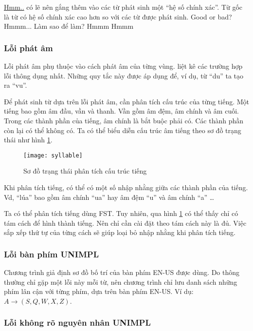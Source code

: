 \documentclass[a4paper,oneside]{book} %
\newcommand{\note}[1]{\underline{#1}}
\begin{document}
\note{Hmm..} có lẽ nên gắng thêm vào các từ phát sinh một ``hệ số chính
xác''. Từ gốc là từ có hệ số chính xác cao hơn so với các từ được phát
sinh. Good or bad? Hmmm... Làm sao để làm? Hmmm Hmmm

\subsubsection{Lỗi phát âm}

Lỗi phát âm phụ thuộc vào cách phát âm của từng
vùng. \cite{LoiChinhTa} liệt kê các trường hợp   lỗi thông dụng
nhất. Những quy tắc này được áp dụng để, ví dụ, từ   ``du'' ta tạo ra
``vu''. 

Để phát sinh từ dựa trên lỗi phát âm, cần phân tích cấu trúc của từng
tiếng. Một tiếng bao gồm âm đầu, vần và thanh. Vần gồm âm đệm, âm
chính và âm cuối. Trong các thành phần của tiếng, âm chính là bắt buộc
phải có. Các thành phần còn lại có thể không có. Ta có thể biểu diễn
cấu trúc âm tiếng theo sơ đồ trạng thái như hình \ref{fig:syllable}.

\begin{figure}[htbp]
  \centering
  \texttt{[image: syllable]}
  \caption{Sơ đồ trạng thái phân tích cấu trúc tiếng}
  \label{fig:syllable}
\end{figure}

Khi phân tích tiếng, có thể có một số nhập nhằng giữa các thành phần
của tiếng. Vd, ``lúa'' bao gồm âm chính ``ua'' hay âm đệm ``u'' và âm
chính ``a'' \ldots

Ta có thể phân tích tiếng dùng FST. Tuy nhiên, qua hình
\ref{fig:syllable} có thể thấy chỉ có tám cách để hình thành
tiếng. Nên chỉ cần cài đặt theo tám cách này là đủ. Việc sắp xếp thứ
tự của từng cách sẽ giúp loại bỏ nhập nhằng khi phân tích tiếng.

\subsubsection{Lỗi bàn phím UNIMPL}

Chương trình giả định sơ đồ bố trí của bàn phím EN-US được dùng. Do
thông thường chỉ gặp một lỗi này mỗi từ, nên chương trình chỉ lưu danh
sách những phím lân cận với từng phím, dựa trên bàn phím EN-US. Ví dụ:
$A \rightarrow (S,Q,W,X,Z)$. 

\subsubsection{Lỗi không rõ nguyên nhân UNIMPL}
\end{document}
